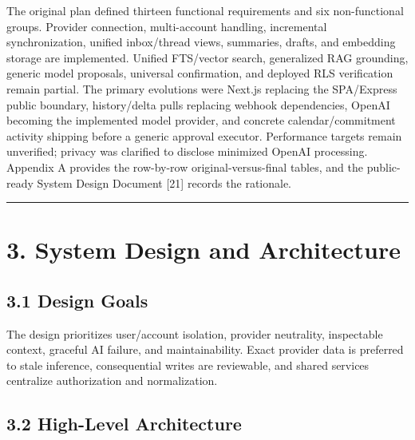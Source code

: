 \documentclass[
]{report}
\begin{document}
The original plan defined thirteen functional requirements and six
non-functional groups. Provider connection, multi-account handling,
incremental synchronization, unified inbox/thread views, summaries,
drafts, and embedding storage are implemented. Unified FTS/vector
search, generalized RAG grounding, generic model proposals, universal
confirmation, and deployed RLS verification remain partial. The primary
evolutions were Next.js replacing the SPA/Express public boundary,
history/delta pulls replacing webhook dependencies, OpenAI becoming the
implemented model provider, and concrete calendar/commitment activity
shipping before a generic approval executor. Performance targets remain
unverified; privacy was clarified to disclose minimized OpenAI
processing. Appendix A provides the row-by-row original-versus-final
tables, and the public-ready System Design Document {[}21{]} records the
rationale.

\begin{center}\rule{0.5\linewidth}{0.5pt}\end{center}

\chapter{3. System Design and
Architecture}\label{3-system-design-and-architecture}

\section{3.1 Design Goals}\label{31-design-goals}

The design prioritizes user/account isolation, provider neutrality,
inspectable context, graceful AI failure, and maintainability. Exact
provider data is preferred to stale inference, consequential writes are
reviewable, and shared services centralize authorization and
normalization.

\section{3.2 High-Level Architecture}\label{32-high-level-architecture}
\end{document}
